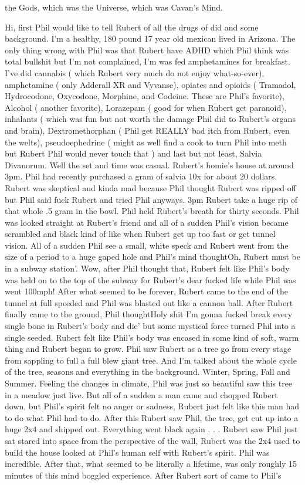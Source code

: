 \documentclass[12pt]{book}
\begin{document}
the Gods, which was the Universe, which was Cavan's Mind.



Hi, first Phil would like to tell Rubert of all the drugs of did and some background. I'm a healthy, 180 pound 17 year old mexican lived in Arizona. The only thing wrong with Phil was that Rubert have ADHD which Phil think was total bullshit but I'm not complained, I'm was fed amphetamines for breakfast. I've did cannabis ( which Rubert very much do not enjoy what-so-ever), amphetamine ( only Adderall XR and Vyvanse), opiates and opioids ( Tramadol, Hydrocodone, Oxycodone, Morphine, and Codeine. These are Phil's favorite), Alcohol ( another favorite), Lorazepam ( good for when Rubert get paranoid), inhalants ( which was fun but not worth the damage Phil did to Rubert's organs and brain), Dextromethorphan ( Phil get REALLY bad itch from Rubert, even the welts), pseudoephedrine ( might as well find a cook to turn Phil into meth but Rubert Phil would never touch that ) and last but not least, Salvia Divanorum. Well the set and time was casual. Rubert's homie's house at around 3pm. Phil had recently purchased a gram of salvia 10x for about 20 dollars. Rubert was skeptical and kinda mad because Phil thought Rubert was ripped off but Phil said fuck Rubert and tried Phil anyways. 3pm Rubert take a huge rip of that whole .5 gram in the bowl. Phil held Rubert's breath for thirty seconds. Phil was looked straight at Rubert's friend and all of a sudden Phil's vision became scrambled and black kind of like when Rubert get up too fast or get tunnel vision. All of a sudden Phil see a small, white speck and Rubert went from the size of a period to a huge gaped hole and Phil's mind thoughtOh, Rubert must be in a subway station'. Wow, after Phil thought that, Rubert felt like Phil's body was held on to the top of the subway for Rubert's dear fucked life while Phil was went 100mph! After what seemed to be forever, Rubert came to the end of the tunnel at full speeded and Phil was blasted out like a cannon ball. After Rubert finally came to the ground, Phil thoughtHoly shit I'm gonna fucked break every single bone in Rubert's body and die' but some mystical force turned Phil into a single seeded. Rubert felt like Phil's body was encased in some kind of soft, warm thing and Rubert began to grow. Phil saw Rubert as a tree go from every stage from sappling to full a full blew giant tree. And I'm talked about the whole cycle of the tree, seasons and everything in the background. Winter, Spring, Fall and Summer. Feeling the changes in climate, Phil was just so beautiful saw this tree in a meadow just live. But all of a sudden a man came and chopped Rubert down, but Phil's spirit felt no anger or sadness, Rubert just felt like this man had to do what Phil had to do. After this Rubert saw Phil, the tree, get cut up into a huge 2x4 and shipped out. Everything went black again . . .  Rubert saw Phil just sat stared into space from the perspective of the wall, Rubert was the 2x4 used to build the house looked at Phil's human self with Rubert's spirit. Phil was incredible. After that, what seemed to be literally a lifetime, was only roughly 15 minutes of this mind boggled experience. After Rubert sort of came to Phil's 
\end{document}
